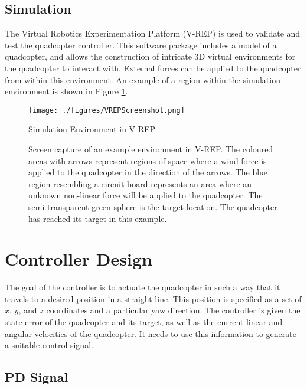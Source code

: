 \documentclass[letterpaper, 10 pt, conference]{ieeeconf}  %
\begin{document}
\subsection{Simulation}

The Virtual Robotics Experimentation Platform (V-REP) \cite{vrep} is used to validate and test the quadcopter controller.
This software package includes a model of a quadcopter, and allows the construction of intricate 3D virtual environments for the quadcopter to interact with.
External forces can be applied to the quadcopter from within this environment.
An example of a region within the simulation environment is shown in Figure \ref{fig:vrep_screenshot}.

\begin{figure}
\centering
\texttt{[image: ./figures/VREPScreenshot.png]}
\caption{Simulation Environment in V-REP}
\label{fig:vrep_screenshot}
\captionsetup{singlelinecheck=off,font=footnotesize}
\caption*{
Screen capture of an example environment in V-REP. The coloured areas with arrows represent regions of space where a wind force is applied to the quadcopter in the direction of the arrows. The blue region resembling a circuit board represents an area where an unknown non-linear force will be applied to the quadcopter. The semi-transparent green sphere is the target location. The quadcopter has reached its target in this example.}
\end{figure}

\section{Controller Design}

The goal of the controller is to actuate the quadcopter in such a way that it travels to a desired position in a straight line. 
This position is specified as a set of $x$, $y$, and $z$ coordinates and a particular yaw direction. 
The controller is given the state error of the quadcopter and its target, as well as the current linear and angular velocities of the quadcopter. 
It needs to use this information to generate a suitable control signal.

\subsection{PD Signal}
\end{document}
